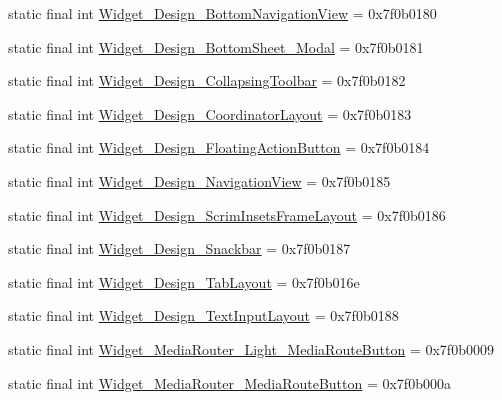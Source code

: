 \begin{CompactItemize}
\item 
static final int \hyperlink{classandroid_1_1support_1_1v7_1_1cardview_1_1_r_1_1style_45846f137ffc8541c0429a739a2b904f}{Widget\_\-Design\_\-BottomNavigationView} = 0x7f0b0180
\item 
static final int \hyperlink{classandroid_1_1support_1_1v7_1_1cardview_1_1_r_1_1style_77a54992f3a3beb90baf9ea1a55c7c05}{Widget\_\-Design\_\-BottomSheet\_\-Modal} = 0x7f0b0181
\item 
static final int \hyperlink{classandroid_1_1support_1_1v7_1_1cardview_1_1_r_1_1style_23f2c61919f0f2c3b15536b650855a70}{Widget\_\-Design\_\-CollapsingToolbar} = 0x7f0b0182
\item 
static final int \hyperlink{classandroid_1_1support_1_1v7_1_1cardview_1_1_r_1_1style_894616c80931505f9b790fee6d791ef7}{Widget\_\-Design\_\-CoordinatorLayout} = 0x7f0b0183
\item 
static final int \hyperlink{classandroid_1_1support_1_1v7_1_1cardview_1_1_r_1_1style_b2a22fad6b545a6eb935cdee84699d63}{Widget\_\-Design\_\-FloatingActionButton} = 0x7f0b0184
\item 
static final int \hyperlink{classandroid_1_1support_1_1v7_1_1cardview_1_1_r_1_1style_ffb29b96d268d0cebc254445ad636e8b}{Widget\_\-Design\_\-NavigationView} = 0x7f0b0185
\item 
static final int \hyperlink{classandroid_1_1support_1_1v7_1_1cardview_1_1_r_1_1style_763bdf14282898abea68da82b1635d5b}{Widget\_\-Design\_\-ScrimInsetsFrameLayout} = 0x7f0b0186
\item 
static final int \hyperlink{classandroid_1_1support_1_1v7_1_1cardview_1_1_r_1_1style_9ef485be8eb5cc1bd9ab5b0886059cd8}{Widget\_\-Design\_\-Snackbar} = 0x7f0b0187
\item 
static final int \hyperlink{classandroid_1_1support_1_1v7_1_1cardview_1_1_r_1_1style_2c1815425aa37ebb0383cc7c5a17ba63}{Widget\_\-Design\_\-TabLayout} = 0x7f0b016e
\item 
static final int \hyperlink{classandroid_1_1support_1_1v7_1_1cardview_1_1_r_1_1style_7e6570f2d53188ba5ba95439a0ac2c47}{Widget\_\-Design\_\-TextInputLayout} = 0x7f0b0188
\item 
static final int \hyperlink{classandroid_1_1support_1_1v7_1_1cardview_1_1_r_1_1style_9219ce44a1b4249936e5519c0a532a65}{Widget\_\-MediaRouter\_\-Light\_\-MediaRouteButton} = 0x7f0b0009
\item 
static final int \hyperlink{classandroid_1_1support_1_1v7_1_1cardview_1_1_r_1_1style_1cb8cc7f99efaec33775faaa2e777f5d}{Widget\_\-MediaRouter\_\-MediaRouteButton} = 0x7f0b000a
\end{CompactItemize}



